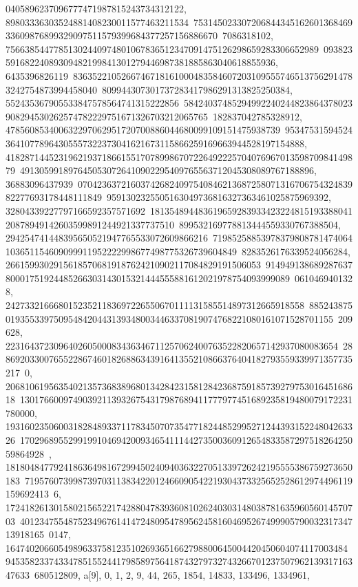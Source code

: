 {{{0405896237096777471987815243734312122, 89803336303524881408230011577463211534\
75314502330720684434516260136846933609876899329097511579399684377257156886670\
7086318102, 75663854477851302440974801067836512347091475126298659283306652989\
09382359168224089309482199841301279446987381885863040618855936, 6435396826119\
83635221052667467181610004835846072031095557465137562914783242754873994458040\
809944307301737283417986291313825250384, 552435367905533847578564741315222856\
58424037485294992240244823864378023908294530262574782229751671326703212065765\
182837042785328912, 478560853400632297062951720700886044680099109151475938739\
9534753159452436410778964305557322373041621673115866259169663944528197154888, 
   41828714452319621937186615517078998670722649222570407696701359870984149879\
4913059918976450530726410902295409765563712045308089767188896, 36883096437939\
07042363721603742682409754084621368725807131670675432483982277693178448111849\
9591302325505163049736816327363461025875969392, 32804339227797166592357571692\
18135489448361965928393342322481519338804120878949142603599891244921337737510\
899532169778813444559330767388504, 294254741448395650521947765533072609866216\
71985258853978379808781474064103651154609099911952222998677498775326739604849\
8283526176339524056284, 26615993029156185706819187624210902117084829191506053\
91494913868928763780001751924485266303143015321444555881612021978754093999089\
0610469401328, 24273321666801523521183697226550670111131585514897312665918558\
88524387501935533975095484204431393480034463370819074768221080161071528701155\
209628, 223164372309640260500083436346711257062400763522820657142937080083654\
28869203300765522867460182688634391641355210866376404182793559339971357735217\
0, 20681061956354021357368389680134284231581284236875918573927975301645168618\
130176600974903921139326754317987689411777977451689235819480079172231780000, 
   19316023506003182848933711783450707354771824485299527124439315224804263326\
17029689552991991046942009346541114427350036091265483358729751826425059864928\
, 181804847792418636498167299450240940363227051339726242195555386759273650183\
71957607399873970311383422012466090542219304373325652528612974496119159692413\
6, 17241826130158021565221742880478393608102624030314803878163596056014570703\
40123475548752349676141472480954789562458160469526749990579003231734713918165\
0147, 16474020660549896337581235102693651662798800645004420450604074117003484\
94535823374334785155244179858975641874327973274326670123750796213931716347633\
680512809}}, {a[9], {0, 1, 2, 9, 44, 265, 1854, 14833, 133496, 1334961, 
}}}
